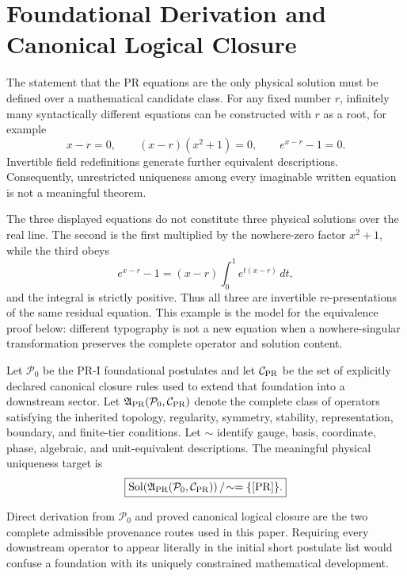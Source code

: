 \section{Foundational Derivation and Canonical Logical Closure}
\label{sec:pr35-foundational-derivation-standard}

The statement that the PR equations are the only physical solution must be
defined over a mathematical candidate class.  For any fixed number $r$,
infinitely many syntactically different equations can be constructed with $r$
as a root, for example
\begin{equation}
x-r=0,
\qquad
(x-r)(x^2+1)=0,
\qquad
e^{x-r}-1=0.
\end{equation}
Invertible field redefinitions generate further equivalent descriptions.
Consequently, unrestricted uniqueness among every imaginable written equation
is not a meaningful theorem.

The three displayed equations do not constitute three physical solutions over
the real line.  The second is the first multiplied by the nowhere-zero factor
$x^2+1$, while the third obeys
\begin{equation}
 e^{x-r}-1
 =(x-r)\int_0^1 e^{t(x-r)}\,dt,
\end{equation}
and the integral is strictly positive.  Thus all three are invertible
re-presentations of the same residual equation.  This example is the model for
the equivalence proof below: different typography is not a new equation when a
nowhere-singular transformation preserves the complete operator and solution
content.

Let $\mathcal P_0$ be the PR-I foundational postulates and let
$\mathcal C_{\rm PR}$ be the set of explicitly declared canonical closure
rules used to extend that foundation into a downstream sector.  Let
$\mathfrak A_{\rm PR}(\mathcal P_0,\mathcal C_{\rm PR})$ denote the complete
class of operators satisfying the inherited topology, regularity, symmetry,
stability, representation, boundary, and finite-tier conditions.  Let $\sim$
identify gauge, basis, coordinate, phase, algebraic, and unit-equivalent
descriptions.  The meaningful physical uniqueness target is
\begin{equation}
\boxed{
\operatorname{Sol}\!\left(
\mathfrak A_{\rm PR}(\mathcal P_0,\mathcal C_{\rm PR})
\right)/\!\sim
=
\{[\mathrm{PR}]\}.}
\label{eq:pr35-physical-uniqueness-target}
\end{equation}

Direct derivation from $\mathcal P_0$ and proved canonical logical closure are
the two complete admissible provenance routes used in this paper.  Requiring
every downstream operator to appear literally in the initial short postulate
list would confuse a foundation with its uniquely constrained mathematical
development.

